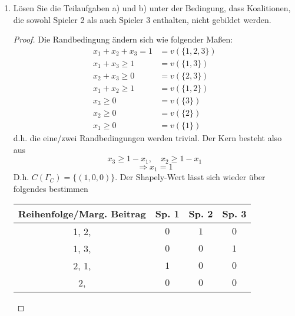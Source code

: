 \documentclass[12pt]{extreport} %
\theoremstyle{named}
\theoremstyle{itshape}
\theoremstyle{normal}
\begin{document}
\begin{enumerate}
\begin{proof}
\begin{center}
\begin{tabular}{| c | c | c | c |}
       						\hline
    					$2, 3, 1$ & $0$ & $0$ & $1$  \\
      						\hline
    					$3, 1, 2$ & $1$ & $0$ & $0$  \\
      						\hline
    					$3, 2, 1$ & $0$ & $1$ & $0$  \\
      						\hline \hline
    					$\phi_{i}(\Sigma_{C}) = \Sigma$  & $2$ & $2$ & $2$  \\
    				\hline
   				 \end{tabular}
    		\end{center}
    		d.h. $\Phi(\Sigma_{C}) = \left(\frac{2}{6}, \frac{2}{6}, \frac{2}{6} \right)$.
		\end{proof}
	\item Lösen Sie die Teilaufgaben a) und b) unter der Bedingung, dass Koalitionen, die sowohl Spieler 2 als auch Spieler 3 enthalten, nicht gebildet werden.
		\begin{proof}
			Die Randbedingung ändern sich wie folgender Maßen:
			\begin{align*}
				x_{1} + x_{2} + x_{3} = 1 & = v(\{1, 2, 3 \}) \\
				x_{1} + x_{3} \geq 1 & = v(\{1, 3 \}) \\
				x_{2} + x_{3} \geq 0 & = v(\{ 2, 3 \}) \\
				x_{1} + x_{2} \geq 1 & = v(\{ 1, 2 \}) \\
				x_{3} \geq 0 & = v(\{ 3 \}) \\
			    x_{2} \geq 0 & = v(\{ 2 \}) \\
				x_{1} \geq 0 & = v(\{ 1 \})
			\end{align*}
			d.h. die eine/zwei Randbedingungen werden trivial. Der Kern besteht also aus
			$$ x_{3} \geq 1 - x_{1}, \quad x_{2} \geq 1 - x_{1} $$
			$$ \Rightarrow x_{1} = 1 $$
			D.h. $C(\Gamma_{C}) = \{ (1, 0, 0) \}$. Der Shapely-Wert lässt sich wieder über folgendes bestimmen
			\begin{center}
    			\begin{tabular}{| c | c | c | c |}
   					\hline
    					Reihenfolge/Marg. Beitrag &  Sp. 1 & Sp. 2 & Sp. 3  \\ 
    						\hline
    					1, 2, \deleted{\color{red}{3}} & $0$ & $1$ & $0$  \\ 
    						\hline
    					1, 3, \deleted{\color{red}{2}} & $0$ & $0$ & $1$  \\
    						\hline
    					2, 1, \deleted{\color{red}{3}} & $1$ & $0$ & $0$  \\
       						\hline
    					2, \deleted{\color{red}{3, 1}} & $0$ & $0$ & $0$  \\

\end{tabular}
\end{center}
\end{proof}
\end{enumerate}
\end{document}
